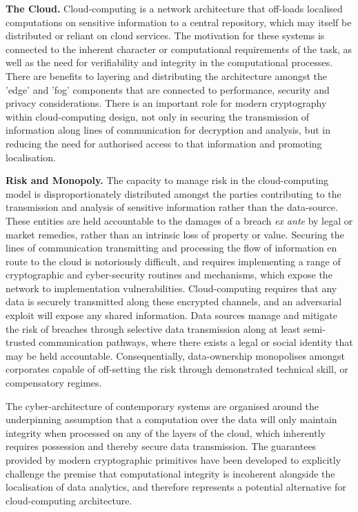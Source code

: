 \documentclass[twocolumn]{scrartcl}
\begin{document}
\textbf{The Cloud.} Cloud-computing is a network architecture that off-loads localised computations on sensitive information to a central repository, which may itself be distributed or reliant on cloud services. The motivation for these systems is connected to the inherent character or computational requirements of the task, as well as the need for verifiability and integrity in the computational processes. There are benefits to layering and distributing the architecture amongst the 'edge' and 'fog' components that are connected to performance, security and privacy considerations. There is an important role for modern cryptography within cloud-computing design, not only in securing the transmission of information along lines of communication for decryption and analysis, but in reducing the need for authorised access to that information and promoting localisation.

\textbf{Risk and Monopoly.} The capacity to manage risk in the cloud-computing model is disproportionately distributed amongst the parties contributing to the transmission and analysis of sensitive information rather than the data-source. These entities are held accountable to the damages of a breach \textit{ex ante} by legal or market remedies, rather than an intrinsic loss of property or value. Securing the lines of communication transmitting and processing the flow of information en route to the cloud is notoriously difficult, and requires implementing a range of cryptographic and cyber-security routines and mechanisms, which expose the network to implementation vulnerabilities. Cloud-computing requires that any data is securely transmitted along these encrypted channels, and an adversarial exploit will expose any shared information. Data sources manage and mitigate the risk of breaches through selective data transmission along at least semi-trusted communication pathways, where there exists a legal or social identity that may be held accountable. Consequentially, data-ownership monopolises amongst corporates capable of off-setting the risk through demonstrated technical skill, or compensatory regimes. 

The cyber-architecture of contemporary systems are organised around the underpinning assumption that a computation over the data will only maintain integrity when processed on any of the layers of the cloud, which inherently requires possession and thereby secure data transmission. The guarantees provided by modern cryptographic primitives have been developed to explicitly challenge the premise that computational integrity is incoherent alongside the localisation of data analytics, and therefore represents a potential alternative for cloud-computing architecture.
\end{document}
